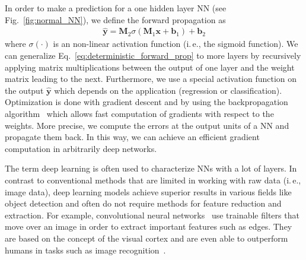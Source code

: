 \documentclass[runningheads]{llncs}
\begin{document}
In order to make a prediction for a one hidden layer NN (see Fig.~\ref{fig:normal_NN}), we define the forward propagation as
\begin{align}
    \hat{\mathbf{y}} = \mathbf{M}_2\sigma\left(\mathbf{M}_1 \mathbf{x} + \mathbf{b}_1\right) + \mathbf{b}_2\label{eq:deterministic_forward_prop}
\end{align}
where $\sigma(\cdot)$ is an non-linear activation function (i.\,e., the sigmoid function).
We can generalize Eq.~\ref{eq:deterministic_forward_prop} to more layers by recursively applying matrix multiplications between the output of one layer and the weight matrix leading to the next.
Furthermore, we use a special activation function on the output $\hat{\mathbf{y}}$ which depends on the application (regression or classification). 
Optimization is done with gradient descent and by using the backpropagation algorithm~\cite{Rumelhart:1986we} which allows fast computation of gradients with respect to the weights.
More precise, we compute the errors at the output units of a NN and propagate them back.
In this way, we can achieve an efficient gradient computation in arbitrarily deep networks.

The term deep learning is often used to characterize NNs with a lot of layers. 
In contrast to conventional methods that are limited in working with raw data (i.\,e., image data), deep learning models achieve superior results in various fields like object detection and often do not require methods for feature reduction and extraction.
For example, convolutional neural networks~\cite{krizhevsky2012imagenet} use trainable filters that move over an image in order to extract important features such as edges.
They are based on the concept of the visual cortex and are even able to outperform humans in tasks such as image recognition~\cite{krizhevsky2012imagenet,efficient_net}.
\end{document}
